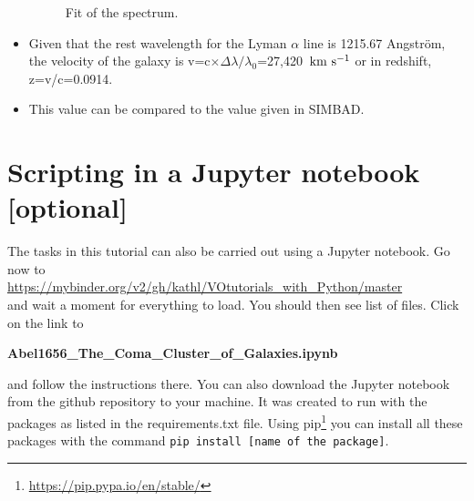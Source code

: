 \documentclass [a4paper, 12pt]{article}
\def\kms{\rm km\ s^{-1}}
\newcommand{\simbad}{{\textsc{SIMBAD}}}
\begin{document}
\begin{itemize}
\begin{figure}[H]
\caption{Fit of the spectrum.}
\label{fig:specfit}
\end{figure}
\item Given that the rest wavelength for the Lyman $\alpha$ line is 1215.67 Angstr\"om, the velocity of the galaxy is v=c$\times\Delta\lambda/\lambda_0$=27,420~$\kms$ or in redshift, z=v/c=0.0914.

\item This value can be compared to the value given in \simbad.
\end{itemize}
 
\section{Scripting in a Jupyter notebook [optional]}

The tasks in this tutorial can also be carried out using a Jupyter notebook. 
Go now to\\
\url{https://mybinder.org/v2/gh/kathl/VOtutorials_with_Python/master}\\
and wait a moment for everything to load. You should then see list of files. 
Click on the link to 

\textbf{Abel1656\_The\_Coma\_Cluster\_of\_Galaxies.ipynb}

\noindent and follow the instructions there. You can also download the Jupyter 
notebook from the github repository to your machine. It was created to run with 
the packages as listed in the requirements.txt file. Using 
pip\footnote{\url{https://pip.pypa.io/en/stable/}} you can install all these 
packages with the command \texttt{pip install [name of the package]}. 

%
\end{document}
